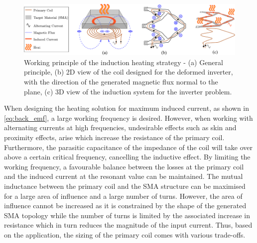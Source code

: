 \begin{figure}[hbt!]
  \centering
  \includegraphics[width=\textwidth]{images/chap5/07_final_schematic_induction.pdf}
  \caption[Working principle of the induction heating strategy]{Working principle of the induction heating strategy - (a) General principle, (b) 2D view of the coil designed for the deformed inverter, with the direction of the generated magnetic flux normal to the plane, (c) 3D view of the induction system for the inverter problem.}
  \label{fig:induction_schematic}
\end{figure}

When designing the heating solution for maximum induced current, as shown in \cref{eq:back_emf}, a large working frequency is desired. However, when working with alternating currents at high frequencies, undesirable effects such as skin and proximity effects, arise which increase the resistance of the primary coil. Furthermore, the parasitic capacitance of the impedance of the coil will take over above a certain critical frequency, cancelling the inductive effect. By limiting the working frequency, a favourable balance between the losses at the primary coil and the induced current at the resonant value can be maintained. The mutual inductance between the primary coil and the SMA structure can be maximised for a large area of influence and a large number of turns. However, the area of influence cannot be increased as it is constrained by the shape of the generated SMA topology while the number of turns is limited by the associated increase in resistance which in turn reduces the magnitude of the input current. Thus, based on the application, the sizing of the primary coil comes with various trade-offs.

